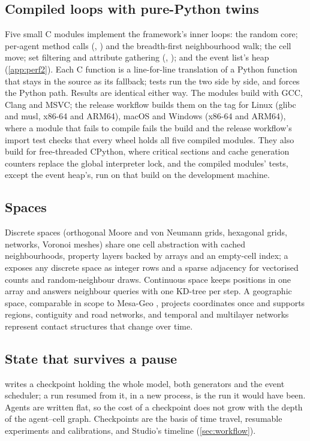 \subsection{Compiled loops with pure-Python twins}

Five small C modules implement the framework's inner loops: the random core; per-agent method
calls (, ) and the breadth-first neighbourhood walk; the cell move;
set filtering and attribute gathering (, ); and the event list's heap (\cref{app:perf2}). Each C function is a
line-for-line translation of a \modelly{} Python function that stays in the source as its
fallback; tests run the
two side by side, and  forces the Python path. Results are
identical either way. The modules build with GCC, Clang and MSVC; the release workflow builds
them on the tag for Linux (glibc and musl, x86-64 and ARM64), macOS and Windows (x86-64 and
ARM64), where a module that fails to compile fails the
build and the release workflow's import test checks that every wheel holds all five compiled
modules. They also build for free-threaded CPython,
where critical sections and cache generation counters replace the global interpreter lock,
and the compiled modules' tests, except the event heap's, run on that build on the development
machine.

\subsection{Spaces}

Discrete spaces (orthogonal Moore and von Neumann grids, hexagonal grids, networks, Voronoi
meshes) share one cell abstraction with cached neighbourhoods, property layers backed by arrays
and an empty-cell index; a  exposes any discrete space as integer rows and a
sparse adjacency for vectorised counts and random-neighbour draws. Continuous space keeps
positions in one array and answers neighbour queries with one KD-tree per step. A geographic
space, comparable in scope to Mesa-Geo \citep{wang2022mesageo}, projects coordinates once and supports regions, contiguity and road networks, and
temporal and multilayer networks represent contact structures that change over time.

\subsection{State that survives a pause}

 writes a checkpoint holding the whole model, both generators and the
event scheduler; a run resumed from it, in a new process, is the run it would have been.
Agents are written flat, so the cost of a checkpoint does not grow with the depth of the
agent--cell graph. Checkpoints are the basis of time travel, resumable experiments and
calibrations, and Studio's timeline (\cref{sec:workflow}).
